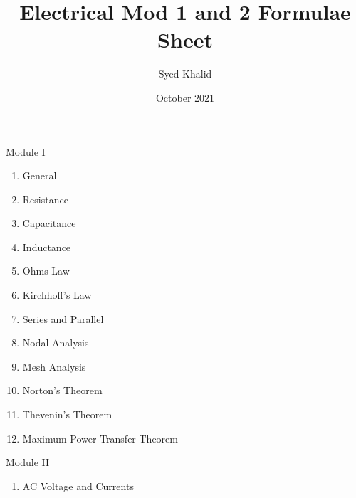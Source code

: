 \documentclass{article}
\title{\textbf{Electrical Mod 1 and 2 Formulae Sheet}}
\author{Syed Khalid}
\date{October 2021}
\begin{document}
\maketitle
Module I
\begin{enumerate}
    \item General
    \item Resistance
    \item Capacitance
    \item Inductance
    \item Ohms Law
    \item Kirchhoff's Law
    \item Series and Parallel
    \item Nodal Analysis
    \item Mesh Analysis
    \item Norton's Theorem
    \item Thevenin's Theorem
    \item Maximum Power Transfer Theorem 
\end{enumerate}

Module II
\begin{enumerate}
    \item AC Voltage and Currents
    
\end{enumerate}
\end{document}
